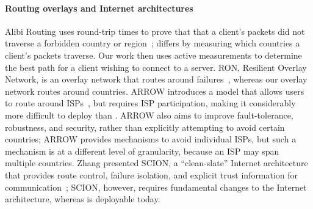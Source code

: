 \paragraph{Routing overlays and Internet architectures} Alibi Routing uses
round-trip times to prove that that a client's packets did  not traverse a
forbidden country or region~\cite{levin2015alibi,levin_detour}; \system{} differs by
measuring  which countries a client's packets traverse.  Our
work then  uses active measurements to determine the best path for a client
wishing  to connect to a server.  RON, Resilient Overlay Network, is an
overlay network that  routes around failures~\cite{andersen2001resilient}, whereas our overlay network
routes around countries.  ARROW introduces a
model that allows users to route around ISPs~\cite{peter2015one}, but requires
ISP participation, making it considerably more difficult to deploy than
\system{}. ARROW also aims to improve fault-tolerance, robustness, and
security, rather than explicitly attempting to avoid certain countries; ARROW
provides mechanisms to avoid individual ISPs, but such a mechanism is at a
different level of granularity, because an ISP may span multiple countries.
Zhang \ea{} presented SCION, a ``clean-slate'' Internet architecture that
provides route control, failure isolation, and explicit trust information for
communication~\cite{zhang2011scion}; SCION, however, requires fundamental
changes to the Internet architecture, whereas \system{} is deployable today.

